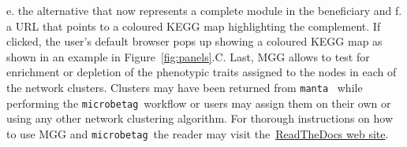 \documentclass[sn-mathphys,Numbered]{sn-jnl}  %
\theoremstyle{thmstyleone}%
\theoremstyle{thmstyletwo}%
\theoremstyle{thmstylethree}%
\newcommand{\microbetag}{\texttt{microbetag}}
\begin{document}
        e. the alternative that now represents a complete module in the beneficiary and
        f. a URL that points to a coloured KEGG map highlighting the complement.
        If clicked, the user's default browser pops up showing a coloured KEGG map as shown in an example in Figure~\ref{fig:panels}.C.
        Last, 
        MGG 
        allows
        to test for enrichment or depletion of the phenotypic traits assigned to the nodes in each of the network clusters. 
        Clusters may have been returned from \texttt{manta}~\cite{rottjers2020manta} while performing the \microbetag~\space workflow or users may assign them on their own or using any other network clustering algorithm.
        For thorough instructions on how to use MGG and \microbetag~\space the reader may visit the~\href{https://hariszaf.github.io/microbetag/docs/cytoApp/}{ReadTheDocs web site}.
\end{document}
